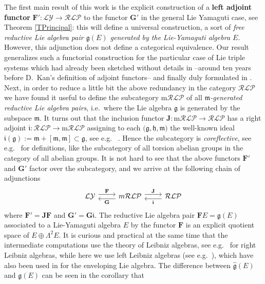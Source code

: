 \documentclass [11pt] {article}
\theoremstyle{definition}
\begin{document}
The first main result of this work is the explicit construction of a 
\textbf{left adjoint functor} $\mathbf{F}':\mathcal{LY}\to \mathcal{RLP}$ to the functor $\mathbf{G}'$ in the general Lie Yamaguti case, see Theorem \ref{TPrincipal}: this will define a universal construction,
a sort of \textit{free reductive Lie algebra pair $\mathfrak{g}(E)$ generated by the Lie-Yamaguti algebra $E$}. However, this adjunction does not define a categorical equivalence. Our result generalizes such a functorial
construction for the particular case of Lie triple systems which had already been sketched without details in 
\cite[p.~155-156]{Jac49} --around ten years before D.~Kan's definition of adjoint functors-- and finally duly formulated in \cite{Smi11}. \\
Next, in order
to reduce a little bit the above redundancy in the category $\mathcal{RLP}$
we have found it useful to define the subcategory $\mathrm{m}\mathcal{RLP}$ of all \textit{$\mathfrak{m}$-generated reductive Lie algebra pairs}, i.e.~where the
Lie algebra $\mathfrak{g}$ is generated by the subspace $\mathfrak{m}$.  It turns out that the inclusion functor
$\mathbf{J}:\mathrm{m}\mathcal{RLP}\to\mathcal{RLP}$ has a right adjoint
$\mathfrak{i}:\mathcal{RLP}\to \mathrm{m}\mathcal{RLP}$ assigning to each
$\big(\mathfrak{g},\mathfrak{h},\mathfrak{m}\big)$ the well-known ideal
$\mathfrak{i}(\mathfrak{g}):=\mathfrak{m}+[\mathfrak{m},\mathfrak{m}]\subset \mathfrak{g}$, see e.g.~\cite[p.~212, Thm.~52]{KN69} 
. Hence the subcategory
is \textit{coreflective}, see e.g.~\cite[p.~91]{Mac98} for definitions,
like the subcategory of all torsion abelian groups in the category of all abelian groups. It is not hard to see that
the above functors $\mathbf{F'}$ and $\mathbf{G'}$ factor over the subcategory, and we arrive at the following chain of adjunctions
\[
    \begin{tikzcd}
    	\mathcal{LY}
    	\arrow[r, yshift=0.7ex, "\mathbf{F}"]
    	          & m\mathcal{RLP}\arrow[l, yshift=-0.7ex, "\mathbf{G}"]
    	          \arrow[r, yshift=0.7ex, "\mathbf{J}"]
    	          &\mathcal{RLP}\arrow[l, yshift=-0.7ex, 
    	          "\boldsymbol{\mathfrak{i}}"]
    \end{tikzcd}
\]
where $\mathbf{F}'=\mathbf{JF}$ and $\mathbf{G}'=\mathbf{G}\boldsymbol{\mathfrak{i}}$.
The reductive Lie algebra pair $\mathbf{F}E=\mathfrak{g}(E)$ associated to a Lie-Yamaguti algebra $E$ by the functor $\mathbf{F}$ is an explicit quotient space of $E\oplus \Lambda^2E$.  It is curious and practical at the same time that the intermediate computations use the theory of Leibniz algebras, see e.g.~\cite{Lod92} for right Leibniz algebras, while here we use left Leibniz algebras (see e.g.~\cite{F}), which have also been used in \cite{KW01} for the enveloping Lie algebra. The difference between $\hat{\mathfrak{g}}(E)$ and $\mathfrak{g}(E)$ can be seen in the corollary that
\end{document}
